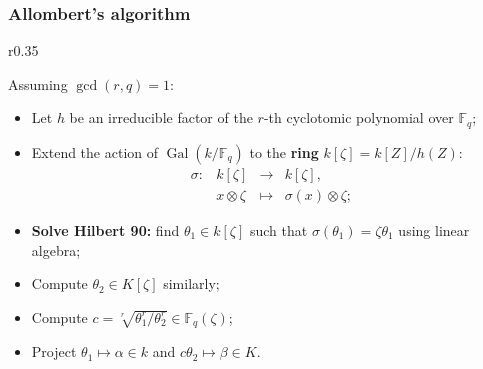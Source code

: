 \documentclass[francais]{beamer}
\def\F {\ensuremath{\mathbb{F}}}
\DeclareMathOperator{\Gal}{Gal}
\begin{document}
\begin{frame}\frametitle{Allombert's algorithm}
      \begin{wrapfigure}[9]{r}{0.35\textwidth}
    \end{wrapfigure}
    
    Assuming $\gcd(r,q)=1$:
    \begin{itemize}
    \item Let $h$ be an irreducible factor of the $r$-th cyclotomic
      polynomial over $\F_q$;
    \item Extend the action of $\Gal(k/\F_q)$ to the \textbf{ring}
      $k[\zeta]=k[Z]/h(Z)$:
      \[\begin{array}{llll}
          \sigma: & k[\zeta] & \rightarrow & k[\zeta], \\
                  & x \otimes \zeta & \mapsto & \sigma(x) \otimes \zeta;
        \end{array}\]
    \end{itemize}

    \begin{itemize}
    \item \textbf{Solve Hilbert 90:} find $\theta_1 \in k[\zeta]$ such that
      $\sigma(\theta_1) = \zeta\theta_1$ using linear algebra;
    \item Compute $\theta_2 \in K[\zeta]$ similarly;
    \end{itemize}

    \begin{itemize}
    \item Compute $c = \sqrt[r]{\theta_1^r/\theta_2^r} \in\F_q(\zeta)$;
    \item Project $\theta_1\mapsto\alpha\in k$ and
      $c\theta_2\mapsto\beta\in K$.
    \end{itemize}
  \end{frame}
\end{document}
